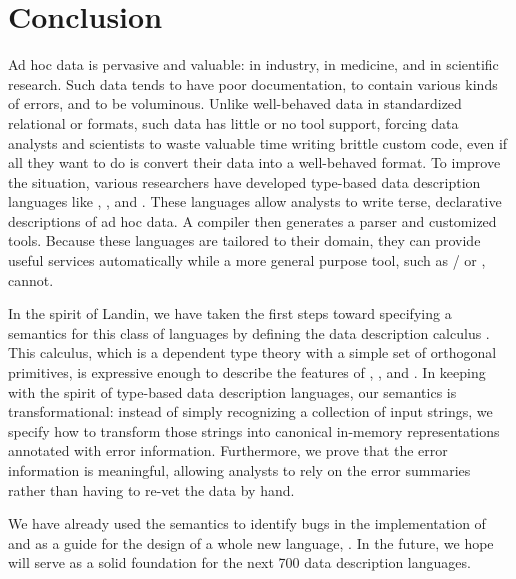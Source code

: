\section{Conclusion} 
\label{sec:conclusion}

Ad hoc data is pervasive and valuable: in industry, in medicine, and
in scientific research.  Such data tends to have poor documentation,
to contain various kinds of errors, and to be voluminous.  Unlike
well-behaved data in standardized relational or \xml{} formats, such
data has little or no tool support, forcing data analysts and
scientists to waste valuable time writing brittle custom code, even if
all they want to do is convert their data into a well-behaved format.
To improve the situation, various researchers have developed type-based data
description languages like \pads{}, \datascript{}, and
\packettypes{}.  These languages allow analysts to write terse,
declarative descriptions of ad hoc data.  A compiler then generates a
parser and customized tools.  Because these languages are tailored to
their domain, they can provide useful services automatically while a
more general purpose tool, such as \lex{}/\yacc{} or \perl{}, cannot.

In the spirit of Landin, we have taken the first steps toward
specifying a semantics for this class of languages by defining the
data description calculus \ddc{}.  This calculus, which is a dependent
type theory with a simple set of orthogonal primitives, is expressive
enough to describe the features of \pads{}, \datascript{}, and
\packettypes{}.  In keeping with the spirit of type-based data description
languages, our semantics is transformational: instead of simply
recognizing a collection of input strings, we specify how to transform
those strings into canonical in-memory representations annotated with
error information.  Furthermore, we prove that the error information
is meaningful, allowing analysts to rely on the error summaries rather
than having to re-vet the data by hand.

We have already used the semantics to identify bugs in the
implementation of \padsc{} and as a guide
for the design of a whole new language, \padsml{}.  In the future, we hope 
\ddc{} will serve as a solid foundation for the next 700 data 
description languages.
